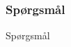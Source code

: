 \documentclass[xcolor={dvipsnames}]{beamer}
\begin{document}

\begin{frame}
\frametitle{Spørgsmål}
Spørgsmål
\end{frame}

\end{document}
